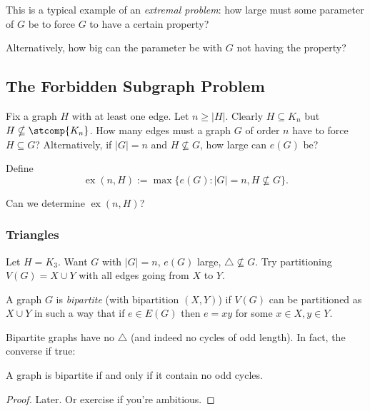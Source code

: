 \documentclass[a4paper]{article}
\DeclareMathOperator{\exx}{ex}
\begin{document}
This is a typical example of an \emph{extremal problem}: how large must some parameter of \(G\) be to force \(G\) to have a certain property?

Alternatively, how big can the parameter be with \(G\) not having the property?

\subsection{The Forbidden Subgraph Problem}

Fix a graph \(H\) with at least one edge. Let \(n \geq |H|\). Clearly \(H \subseteq K_n\) but \(H \nsubseteq \stcomp{K_n}\). How many edges must a graph \(G\) of order \(n\) have to force \(H \subseteq G\)? Alternatively, if \(|G| = n\) and \(H \nsubseteq G\), how large can \(e(G)\) be?

\begin{definition}
  Define
  \[
    \exx(n,H) := \max\{ e(G): |G|=n, H \nsubseteq G\}.
  \]
\end{definition}

\begin{question}
  Can we determine \(\exx(n,H)\)?
\end{question}

\subsubsection{Triangles}

Let \(H = K_3\). Want \(G\) with \(|G| = n\), \(e(G)\) large, \(\triangle \nsubseteq G\). Try partitioning \(V(G) = X\cup Y\) with all edges going from \(X\) to \(Y\).

\begin{definition}
  A graph \(G\) is \emph{bipartite} (with bipartition \((X,Y)\)) if \(V(G)\) can be partitioned as \(X\cup Y\) in such a way that if \(e\in E(G)\) then \(e=xy\) for some \(x\in X, y\in Y\).
\end{definition}

Bipartite graphs have no \(\triangle\) (and indeed no cycles of odd length). In fact, the converse if true:

\begin{theorem}
  A graph is bipartite if and only if it contain no odd cycles.
\end{theorem}

\begin{proof}
  Later. Or exercise if you're ambitious.
\end{proof}
\end{document}
